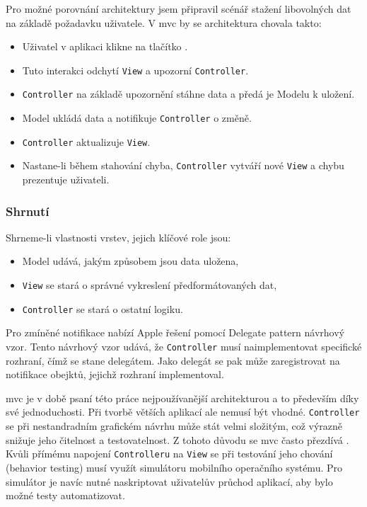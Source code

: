 Pro možné porovnání architektury jsem připravil scénář stažení libovolných dat na základě požadavku uživatele.
V \acrshort{mvc} by se architektura chovala takto:

\begin{itemize}
  \item Uživatel v aplikaci klikne na tlačítko .
  \item Tuto interakci odchytí \texttt{View} a upozorní \texttt{Controller}.
  \item \texttt{Controller} na základě upozornění stáhne data a předá je Modelu k uložení.
  \item Model ukládá data a notifikuje \texttt{Controller} o změně.
  \item \texttt{Controller} aktualizuje \texttt{View}.
  \item Nastane-li během stahování chyba, \texttt{Controller} vytváří nové \texttt{View} a chybu prezentuje uživateli.
\end{itemize}


\subsubsection*{Shrnutí}

Shrneme-li vlastnosti vrstev, jejich klíčové role jsou:

\begin{itemize}
  \item Model udává, jakým způsobem jsou data uložena,
  \item \texttt{View} se stará o správné vykreslení předformátovaných dat,
  \item \texttt{Controller} se stará o ostatní logiku.
\end{itemize}


Pro zmíněné notifikace nabízí Apple řešení pomocí Delegate pattern návrhový vzor.
Tento návrhový vzor udává, že \texttt{Controller} musí naimplementovat specifické rozhraní, čímž se stane delegátem.
Jako delegát se pak může zaregistrovat na notifikace obejktů, jejichž rozhraní implementoval.

\acrshort{mvc} je v době psaní této práce nejpoužívanější architekturou a to především díky své jednoduchosti.
Při tvorbě větších aplikací ale nemusí být vhodné.
\texttt{Controller} se při nestandradním grafickém návrhu může stát velmi složitým, což výrazně snižuje jeho čitelnost a testovatelnost.
Z tohoto důvodu se \acrshort{mvc} často přezdívá .
Kvůli přímému napojení \texttt{Controlleru} na \texttt{View} se při testování jeho chování (behavior testing) musí využít simulátoru mobilního operačního systému.
Pro simulátor je navíc nutné naskriptovat uživatelův průchod aplikací, aby bylo možné testy automatizovat.

